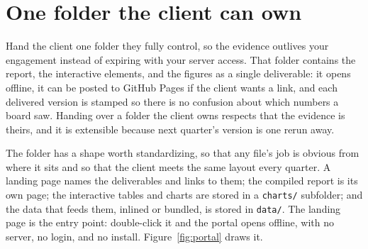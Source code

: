 \section{One folder the client can own}
Hand the client one folder they fully control, so the evidence outlives your engagement instead of expiring with your server access. That folder contains the report, the interactive elements, and the figures as a single deliverable: it opens offline, it can be posted to GitHub Pages if the client wants a link, and each delivered version is stamped so there is no confusion about which numbers a board saw. Handing over a folder the client owns respects that the evidence is theirs, and it is extensible because next quarter's version is one rerun away.

The folder has a shape worth standardizing, so that any file's job is obvious from where it sits and so that the client meets the same layout every quarter. A landing page names the deliverables and links to them; the compiled report is its own page; the interactive tables and charts are stored in a \texttt{charts/} subfolder; and the data that feeds them, inlined or bundled, is stored in \texttt{data/}. The landing page is the entry point: double-click it and the portal opens offline, with no server, no login, and no install. Figure~\ref{fig:portal} draws it.

